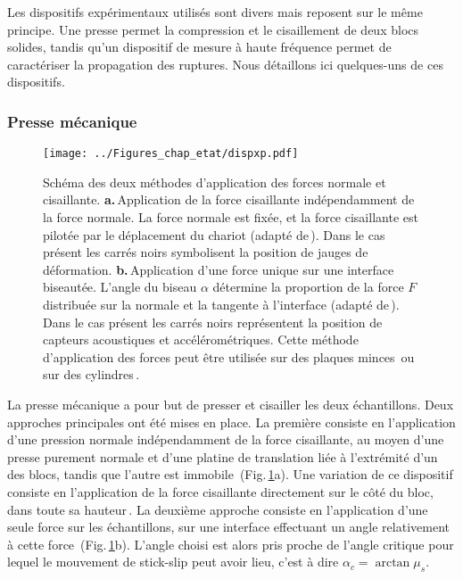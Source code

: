 Les dispositifs expérimentaux utilisés sont divers mais reposent sur le même principe. Une presse permet la compression et le cisaillement de deux blocs solides, tandis qu'un dispositif de mesure à haute fréquence permet de caractériser la propagation des ruptures. Nous détaillons ici quelques-uns de ces dispositifs.


\subsubsection{Presse mécanique}

\begin{figure}[htb]
\centering
\texttt{[image: ../Figures\_chap\_etat/dispxp.pdf]}
\caption[Deux types de presses mécaniques]{Schéma des deux méthodes d'application des forces normale et cisaillante. \textbf{a.}\,Application de la force cisaillante indépendamment de la force normale. La force normale est fixée, et la force cisaillante est pilotée par le déplacement du chariot (adapté de\,\cite{svetlizky_brittle_2019}). Dans le cas présent les carrés noirs symbolisent la position de jauges de déformation. \textbf{b.}\,Application d'une force unique sur une interface biseautée. L'angle du biseau $\alpha$ détermine la proportion de la force $F$ distribuée sur la normale et la tangente à l'interface (adapté de\,\cite{schubnel_photo-acoustic_2011}). Dans le cas présent les carrés noirs représentent la position de capteurs acoustiques et accélérométriques. Cette méthode d'application des forces peut être utilisée sur des plaques minces\,\cite{xia_laboratory_2004, nielsen_experimental_2010,mclaskey_foreshocks_2013, rubino_understanding_2017} ou sur des cylindres\,\cite{schubnel_photo-acoustic_2011,passelegue_sub-rayleigh_2013,passelegue_dynamic_2016}.}
\label{fig:dispxp}
\end{figure}

La presse mécanique a pour but de presser et cisailler les deux échantillons. Deux approches principales ont été mises en place. La première consiste en l'application d'une pression normale indépendamment de la force cisaillante, au moyen d'une presse purement normale et d'une platine de translation liée à l'extrémité d'un des blocs, tandis que l'autre est immobile\,\cite{rubinstein_detachment_2004,rubinstein_crack-like_2006,rubinstein_dynamics_2007,kammer_propagation_2012,kammer_slip_2014, svetlizky_classical_2014,svetlizky_brittle_2017,bayart_slippery_2016,svetlizky_brittle_2019} (Fig.\,\ref{fig:dispxp}a). Une variation de ce dispositif consiste en l'application de la force cisaillante directement sur le côté du bloc, dans toute sa hauteur\,\cite{rosakis_intersonic_2000,mclaskey_earthquake_2019}. La deuxième approche consiste en l'application d'une seule force sur les échantillons, sur une interface effectuant un angle relativement à cette force\,\cite{xia_laboratory_2004,nielsen_experimental_2010, schubnel_photo-acoustic_2011, latour_characterization_2013, mclaskey_foreshocks_2013, passelegue_sub-rayleigh_2013, passelegue_dynamic_2016,rubino_understanding_2017} (Fig.\,\ref{fig:dispxp}b). L'angle choisi est alors pris proche de l'angle critique pour lequel le mouvement de stick-slip peut avoir lieu, c'est à dire $\alpha_c =\arctan \mu_s$.



